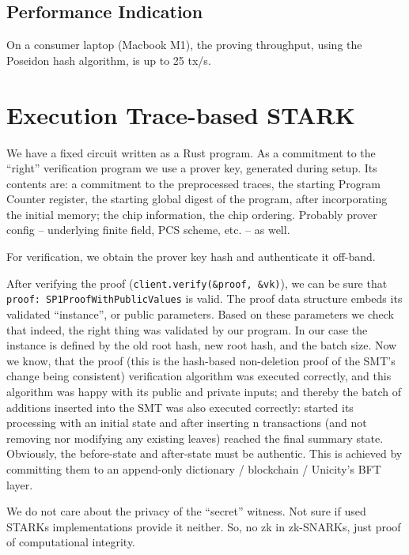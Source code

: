 \documentclass[twocolumn]{article}
\begin{document}
\subsection{Performance Indication}

On a consumer laptop (Macbook M1), the proving throughput, using the Poseidon hash algorithm, is up to 25 tx/s.

\section{Execution Trace-based STARK}

We have a fixed circuit written as a Rust program. As a commitment to the ``right'' verification program we use a prover key, generated during setup. Its contents are: a commitment to the preprocessed traces, the starting Program Counter register, the starting global digest of the program, after incorporating the initial memory; the chip information, the chip ordering. Probably prover config -- underlying finite field, PCS scheme, etc. -- as well.

For verification, we obtain the prover key hash and authenticate it off-band.

\begin{sloppypar}
After verifying the proof (\lstinline|client.verify(&proof, &vk)|), we can be sure that \lstinline|proof: SP1ProofWithPublicValues| is valid. The proof data structure embeds its validated ``instance'', or public parameters. Based on these parameters we check that indeed, the right thing was validated by our program. In our case the instance is defined by the old root hash, new root hash, and the batch size. Now we know, that the proof (this is the hash-based non-deletion proof of the SMT's change being consistent) verification algorithm was executed correctly, and this algorithm was happy with its public and private inputs; and thereby the batch of additions inserted into the SMT was also executed correctly: started its processing with an initial state and after inserting n transactions (and not removing nor modifying any existing leaves) reached the final summary state. Obviously, the before-state and after-state must be authentic. This is achieved by committing them to an append-only dictionary / blockchain / Unicity's BFT layer.
\end{sloppypar}

We do not care about the privacy of the ``secret'' witness. Not sure if used STARKs implementations provide it neither. So, no zk in zk-SNARKs, just proof of computational integrity.
\end{document}
